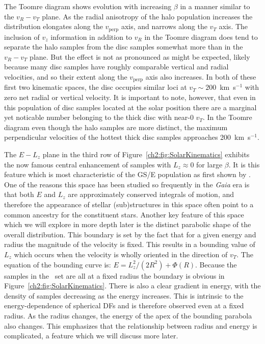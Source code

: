 The Toomre diagram shows evolution with increasing $\beta$ in a manner similar to the $v_{R}-v_{T}$ plane. As the radial anisotropy of the halo population increases the distribution elongates along the $v_\mathrm{perp}$ axis, and narrows along the $v_{T}$ axis. The inclusion of $v_{z}$ information in addition to $v_{R}$ in the Toomre diagram does tend to separate the halo samples from the disc samples somewhat more than in the $v_{R}-v_{T}$ plane. But the effect is not as pronounced as might be expected, likely because many disc samples have roughly comparable vertical and radial velocities, and so their extent along the $v_\mathrm{perp}$ axis also increases. In both of these first two kinematic spaces, the disc occupies similar loci at $v_{T} \sim 200$~km~s$^{-1}$ with zero net radial or vertical velocity. It is important to note, however, that even in this population of disc samples located at the solar position there are a marginal yet noticable number belonging to the thick disc with near-0 $v_{T}$. In the Toomre diagram even though the halo samples are more distinct, the maximum perpendicular velocities of the hottest thick disc samples approaches 200~km~s$^{-1}$. 

The $E-L_{z}$ plane in the third row of Figure~\ref{ch2:fig:SolarKinematics} exhibits the now famous central enhancement of samples with $L_{z} \approx 0$ for large $\beta$. It is this feature which is most characteristic of the GS/E population as first shown by \textcite{helmi18}. One of the reasons this space has been studied so frequently in the \textit{Gaia} era is that both $E$ and $L_{z}$ are approximately conserved integrals of motion, and therefore the appearance of stellar (sub)structures in this space often point to a common ancestry for the constituent stars. Another key feature of this space which we will explore in more depth later is the distinct parabolic shape of the overall distribution. This boundary is set by the fact that for a given energy and radius the magnitude of the velocity is fixed. This results in a bounding value of $L_{z}$ which occurs when the velocity is wholly oriented in the direction of $v_{T}$. The equation of the bounding curve is: $E = L_{z}^{2}/(2R^{2}) + \Phi(R)$. Because the samples in the \solar\ set are all at a fixed radius the boundary is obvious in Figure~\ref{ch2:fig:SolarKinematics}. There is also a clear gradient in energy, with the density of samples decreasing as the energy increases. This is intrinsic to the energy-dependence of spherical DFs \parencite[see chapter 4.3 in ][]{binney08} and is therefore observed even at a fixed radius. As the radius changes, the energy of the apex of the bounding parabola also changes. This emphasizes that the relationship between radius and energy is complicated, a feature which we will discuss more later.

